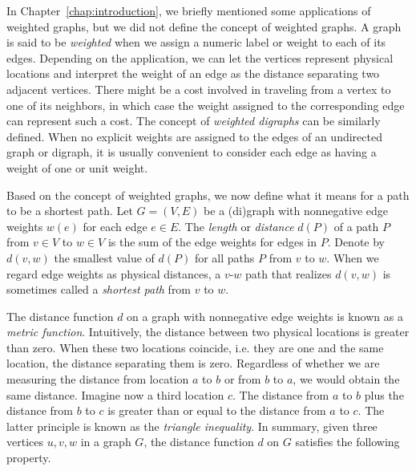 In Chapter~\ref{chap:introduction}, we briefly mentioned some
applications of weighted graphs, but we did not define the concept of
weighted graphs. A graph is said to be
\emph{weighted} when we assign a numeric label
or weight to each of its edges. Depending on the application, we can
let the vertices represent physical locations and interpret the weight
of an edge as the distance separating two adjacent
vertices. There might be a cost involved in traveling from a vertex
to one of its neighbors, in which case the weight assigned to the
corresponding edge can represent such a cost. The concept
of \emph{weighted digraphs} can be similarly
defined. When no explicit weights are assigned to the edges of an
undirected graph or digraph, it is usually convenient to consider each
edge as having a weight of one or unit weight.

Based on the concept of weighted graphs, we now
define what it means for a path to be a shortest
path. Let $G = (V,E)$ be a (di)graph with
nonnegative edge weights $w(e)$ for each
edge $e \in E$. The \emph{length} or
\emph{distance} $d(P)$ of a path $P$ from
$v \in V$ to $w \in V$ is the sum of the edge weights for edges in
$P$. Denote by $d(v,w)$ the smallest value of $d(P)$ for all paths $P$
from $v$ to $w$. When we regard edge weights as physical
distances, a $v$-$w$ path that realizes $d(v,w)$ is
sometimes called a \emph{shortest path} from $v$
to $w$.

The distance function $d$ on a graph with
nonnegative edge weights is known as a
\emph{metric function}. Intuitively, the
distance between two physical locations is greater
than zero. When these two locations coincide, i.e. they are one and
the same location, the distance separating them is zero. Regardless of
whether we are measuring the distance from location $a$ to $b$ or from
$b$ to $a$, we would obtain the same distance. Imagine now a third
location $c$. The distance from $a$ to $b$ plus the distance from $b$
to $c$ is greater than or equal to the distance from $a$ to $c$. The
latter principle is known as the
\emph{triangle inequality}. In summary,
given three vertices $u,v,w$ in a graph $G$, the distance
function $d$ on $G$ satisfies the following
property.

